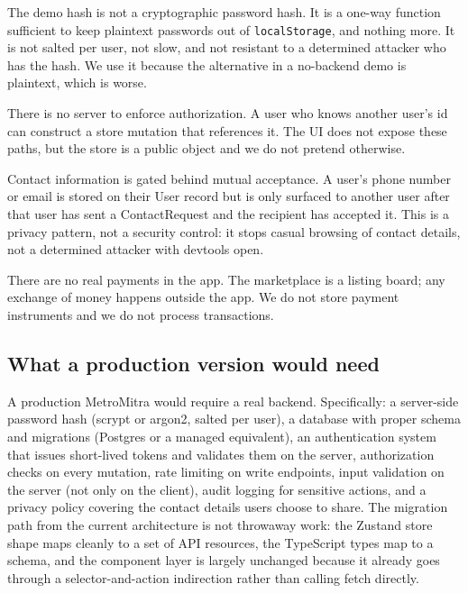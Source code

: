 \documentclass[a4paper,11pt]{article}
\begin{document}
The demo hash is not a cryptographic password hash. It is a one-way function
sufficient to keep plaintext passwords out of \texttt{localStorage}, and
nothing more. It is not salted per user, not slow, and not resistant to a
determined attacker who has the hash. We use it because the alternative in a
no-backend demo is plaintext, which is worse.

There is no server to enforce authorization. A user who knows another user's
id can construct a store mutation that references it. The UI does not expose
these paths, but the store is a public object and we do not pretend
otherwise.

Contact information is gated behind mutual acceptance. A user's phone number
or email is stored on their User record but is only surfaced to another user
after that user has sent a ContactRequest and the recipient has accepted it.
This is a privacy pattern, not a security control: it stops casual browsing
of contact details, not a determined attacker with devtools open.

There are no real payments in the app. The marketplace is a listing board;
any exchange of money happens outside the app. We do not store payment
instruments and we do not process transactions.

\subsection{What a production version would need}

A production MetroMitra would require a real backend. Specifically: a
server-side password hash (scrypt or argon2, salted per user), a database
with proper schema and migrations (Postgres or a managed equivalent), an
authentication system that issues short-lived tokens and validates them on
the server, authorization checks on every mutation, rate limiting on
write endpoints, input validation on the server (not only on the client),
audit logging for sensitive actions, and a privacy policy covering the
contact details users choose to share. The migration path from the current
architecture is not throwaway work: the Zustand store shape maps cleanly to
a set of API resources, the TypeScript types map to a schema, and the
component layer is largely unchanged because it already goes through a
selector-and-action indirection rather than calling fetch directly.

\end{document}
